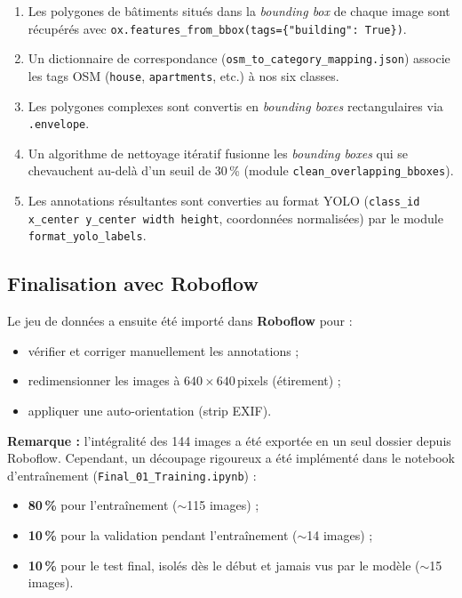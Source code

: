 \documentclass[12pt,a4paper]{article}
\begin{document}
\begin{enumerate}
    \item Les polygones de bâtiments situés dans la \emph{bounding box} de chaque image sont récupérés avec \texttt{ox.features\_from\_bbox(tags=\{"building": True\})}.
    \item Un dictionnaire de correspondance (\texttt{osm\_to\_category\_mapping.json}) associe les tags OSM (\texttt{house}, \texttt{apartments}, etc.) à nos six classes.
    \item Les polygones complexes sont convertis en \emph{bounding boxes} rectangulaires via \texttt{.envelope}.
    \item Un algorithme de nettoyage itératif fusionne les \emph{bounding boxes} qui se chevauchent au-delà d'un seuil de 30\,\% (module \texttt{clean\_overlapping\_bboxes}).
    \item Les annotations résultantes sont converties au format YOLO (\texttt{class\_id x\_center y\_center width height}, coordonnées normalisées) par le module \texttt{format\_yolo\_labels}.
\end{enumerate}

\subsection{Finalisation avec Roboflow}

Le jeu de données a ensuite été importé dans \textbf{Roboflow} pour :
\begin{itemize}
    \item vérifier et corriger manuellement les annotations ;
    \item redimensionner les images à $640 \times 640$\,pixels (étirement) ;
    \item appliquer une auto-orientation (strip EXIF).
\end{itemize}

\noindent\textbf{Remarque :} l'intégralité des 144 images a été exportée en un seul dossier depuis Roboflow. Cependant, un découpage rigoureux a été implémenté dans le notebook d'entraînement (\texttt{Final\_01\_Training.ipynb}) :
\begin{itemize}
    \item \textbf{80\,\%} pour l'entraînement ($\sim$115 images) ;
    \item \textbf{10\,\%} pour la validation pendant l'entraînement ($\sim$14 images) ;
    \item \textbf{10\,\%} pour le test final, isolés dès le début et jamais vus par le modèle ($\sim$15 images).
\end{itemize}
\end{document}
